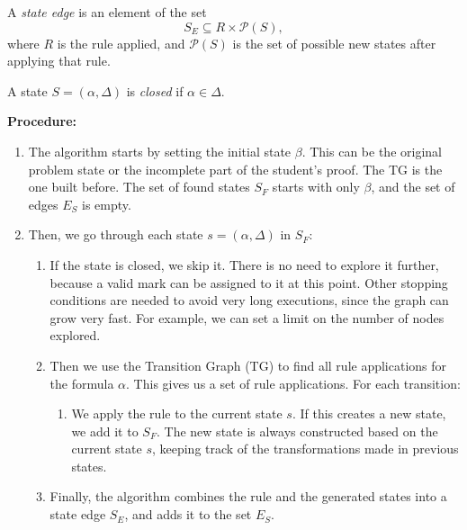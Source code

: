 \begin{definition}
A \emph{state edge} is an element of the set
\[
S_E \subseteq R \times \mathcal{P}(S),
\]
where \(R\) is the rule applied, and \(\mathcal{P}(S)\) is the set of possible new states after applying that rule.
\end{definition}

\begin{definition}
A state \(S = (\alpha, \Delta)\) is \emph{closed} if \(\alpha \in \Delta\).
\end{definition}

\vspace{1em}
\textbf{Procedure:}

\begin{enumerate}
    \item The algorithm starts by setting the initial state \(\beta\). This can be the original problem state or the incomplete part of the student's proof. The TG is the one built before. The set of found states \(S_F\) starts with only \(\beta\), and the set of edges \(E_S\) is empty.

    \item Then, we go through each state \(s = (\alpha, \Delta)\) in \(S_F\):

    \begin{enumerate}
        \item If the state is closed, we skip it. There is no need to explore it further, because a valid mark can be assigned to it at this point. Other stopping conditions are needed to avoid very long executions, since the graph can grow very fast. For example, we can set a limit on the number of nodes explored.

        \item Then we use the Transition Graph (TG) to find all rule applications for the formula \(\alpha\). This gives us a set of rule applications. For each transition:

        \begin{enumerate}
            \item We apply the rule to the current state \(s\). If this creates a new state, we add it to \(S_F\). The new state is always constructed based on the current state \(s\), keeping track of the transformations made in previous states.
        \end{enumerate}

        \item Finally, the algorithm combines the rule and the generated states into a state edge \(S_E\), and adds it to the set \(E_S\).
    \end{enumerate}
\end{enumerate}


